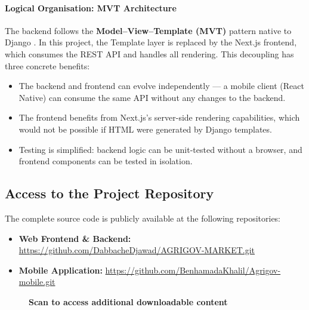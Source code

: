 \paragraph{Logical Organisation: MVT Architecture}
The backend follows the \textbf{Model–View–Template (MVT)} pattern native to Django \cite{DjangoProject2024}. In this project, the Template layer is replaced by the Next.js frontend, which consumes the REST API and handles all rendering. This decoupling has three concrete benefits:

\begin{itemize}
	\item The backend and frontend can evolve independently — a mobile client (React Native) can consume the same API without any changes to the backend.
	\item The frontend benefits from Next.js's server-side rendering capabilities, which would not be possible if HTML were generated by Django templates.
	\item Testing is simplified: backend logic can be unit-tested without a browser, and frontend components can be tested in isolation.
\end{itemize}

\subsection{Access to the Project Repository}

The complete source code is publicly available at the following repositories:

\begin{itemize}
	\item \textbf{Web Frontend \& Backend:} \url{https://github.com/DabbacheDjawad/AGRIGOV-MARKET.git}
	\item \textbf{Mobile Application:} \url{https://github.com/BenhamadaKhalil/Agrigov-mobile.git}
\end{itemize}

\begin{figure}[H]
	\centering
	{\color{black}}
	\vspace{0.6cm}
	
	\textbf{Scan to access additional downloadable content}
\end{figure}

